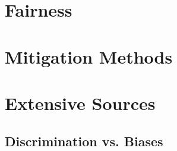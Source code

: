 \documentclass[12pt, a4paper, oneside]{book}   	%
\newif\ifrawcitationactive
\newcommand{\rawcitationstart}{\color{purple}\rawcitationactivetrue}
\begin{document}
		\section{Fairness}
			
			
			
		\section{Mitigation Methods}
			
			
			
		\section{Extensive Sources}
			
			\rawcitationstart
			\subsection{Discrimination vs. Biases}
\end{document}
